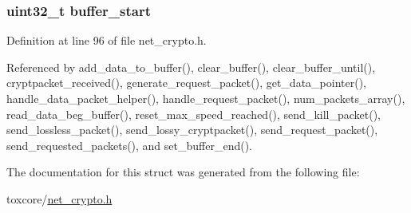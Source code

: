 \hypertarget{struct_packets___array_a85973b335814248c05f63543876b348e}{
\subsubsection[{buffer\+\_\+start}]{\setlength{\rightskip}{0pt plus 5cm}uint32\+\_\+t buffer\+\_\+start}}\label{struct_packets___array_a85973b335814248c05f63543876b348e}


Definition at line 96 of file net\+\_\+crypto.\+h.



Referenced by add\+\_\+data\+\_\+to\+\_\+buffer(), clear\+\_\+buffer(), clear\+\_\+buffer\+\_\+until(), cryptpacket\+\_\+received(), generate\+\_\+request\+\_\+packet(), get\+\_\+data\+\_\+pointer(), handle\+\_\+data\+\_\+packet\+\_\+helper(), handle\+\_\+request\+\_\+packet(), num\+\_\+packets\+\_\+array(), read\+\_\+data\+\_\+beg\+\_\+buffer(), reset\+\_\+max\+\_\+speed\+\_\+reached(), send\+\_\+kill\+\_\+packet(), send\+\_\+lossless\+\_\+packet(), send\+\_\+lossy\+\_\+cryptpacket(), send\+\_\+request\+\_\+packet(), send\+\_\+requested\+\_\+packets(), and set\+\_\+buffer\+\_\+end().



The documentation for this struct was generated from the following file\+:\begin{DoxyCompactItemize}
\item 
toxcore/\hyperlink{net__crypto_8h}{net\+\_\+crypto.\+h}\end{DoxyCompactItemize}

